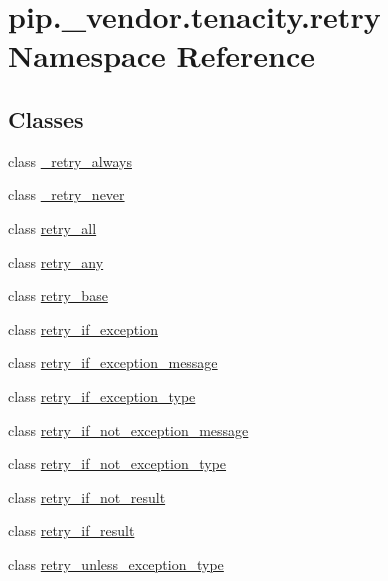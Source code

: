 \hypertarget{namespacepip_1_1__vendor_1_1tenacity_1_1retry}{}\section{pip.\+\_\+vendor.\+tenacity.\+retry Namespace Reference}
\label{namespacepip_1_1__vendor_1_1tenacity_1_1retry}
\subsection*{Classes}
\begin{DoxyCompactItemize}
\item 
class \hyperlink{classpip_1_1__vendor_1_1tenacity_1_1retry_1_1__retry__always}{\+\_\+retry\+\_\+always}
\item 
class \hyperlink{classpip_1_1__vendor_1_1tenacity_1_1retry_1_1__retry__never}{\+\_\+retry\+\_\+never}
\item 
class \hyperlink{classpip_1_1__vendor_1_1tenacity_1_1retry_1_1retry__all}{retry\+\_\+all}
\item 
class \hyperlink{classpip_1_1__vendor_1_1tenacity_1_1retry_1_1retry__any}{retry\+\_\+any}
\item 
class \hyperlink{classpip_1_1__vendor_1_1tenacity_1_1retry_1_1retry__base}{retry\+\_\+base}
\item 
class \hyperlink{classpip_1_1__vendor_1_1tenacity_1_1retry_1_1retry__if__exception}{retry\+\_\+if\+\_\+exception}
\item 
class \hyperlink{classpip_1_1__vendor_1_1tenacity_1_1retry_1_1retry__if__exception__message}{retry\+\_\+if\+\_\+exception\+\_\+message}
\item 
class \hyperlink{classpip_1_1__vendor_1_1tenacity_1_1retry_1_1retry__if__exception__type}{retry\+\_\+if\+\_\+exception\+\_\+type}
\item 
class \hyperlink{classpip_1_1__vendor_1_1tenacity_1_1retry_1_1retry__if__not__exception__message}{retry\+\_\+if\+\_\+not\+\_\+exception\+\_\+message}
\item 
class \hyperlink{classpip_1_1__vendor_1_1tenacity_1_1retry_1_1retry__if__not__exception__type}{retry\+\_\+if\+\_\+not\+\_\+exception\+\_\+type}
\item 
class \hyperlink{classpip_1_1__vendor_1_1tenacity_1_1retry_1_1retry__if__not__result}{retry\+\_\+if\+\_\+not\+\_\+result}
\item 
class \hyperlink{classpip_1_1__vendor_1_1tenacity_1_1retry_1_1retry__if__result}{retry\+\_\+if\+\_\+result}
\item 
class \hyperlink{classpip_1_1__vendor_1_1tenacity_1_1retry_1_1retry__unless__exception__type}{retry\+\_\+unless\+\_\+exception\+\_\+type}
\end{DoxyCompactItemize}
